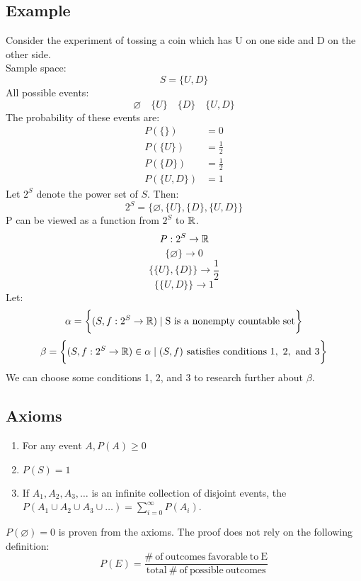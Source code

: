 \documentclass{math}
\begin{document}
\subsection*{Example}
Consider the experiment of tossing a coin which has U on one side and D on the
other side. \\
Sample space:
\[ S = \bigg\{ U, D \bigg\} \]
All possible events:
\[ \varnothing \quad \bigg\{ U \bigg\} \quad \bigg\{ D \bigg\} \quad
   \bigg\{ U, D \bigg\} \]
The probability of these events are:
\begin{align*}
  P(\{ \}) &= 0 \\
  P(\{ U \}) &= \frac{1}{2} \\
  P(\{ D \}) &= \frac{1}{2} \\
  P(\{ U, D \}) &= 1
\end{align*}
Let \( 2^{S} \) denote the power set of \( S \). Then:
\[ 2^{S} = \bigg\{ \varnothing, \{ U \}, \{ D \}, \{ U, D \} \bigg\} \]
P can be viewed as a function from \( 2^{S} \) to \( \mathbb{R} \).
\[ P:2^{S} \to \mathbb{R} \]
\[ \bigg\{ \varnothing \bigg\} \to 0 \]
\[ \bigg\{ \{ U \}, \{ D \} \bigg\} \to \frac{1}{2} \]
\[ \bigg\{ \{ U, D \} \bigg\} \to 1 \]
Let:
\[ \alpha = \bigg\{ (S, f:2^{S} \to \mathbb{R}) \mid \mathrm{S\ is\ a\ nonempty\
   countable\ set} \bigg\} \]
\[ \beta = \bigg\{(S, f:2^{S} \to \mathbb{R}) \in \alpha \mid (S, f)
   \mathrm{\ satisfies\ conditions\ 1,\ 2,\ and\ 3} \bigg\} \]
We can choose some conditions 1, 2, and 3 to research further about
\( \beta \).

\subsection*{Axioms}
\begin{enumerate}
  \item For any event \( A, P(A) \geq 0 \)
  \item \( P(S) = 1 \)
  \item If \( A_{1}, A_{2}, A_{3}, \dots \) is an infinite collection of
    disjoint events, the \( P(A_{1} \cup A_{2} \cup A_{3} \cup \dots) =
    \sum_{i=0}^{\infty}P(A_{i}) \).
\end{enumerate}
\( P(\varnothing) = 0 \) is proven from the axioms. The proof does not rely on
the following definition:
\[ P(E) = \frac{\mathrm{\#\ of\ outcomes\ favorable\ to\ E}}
   {\mathrm{total\ \#\ of\ possible\ outcomes}} \]
\end{document}
